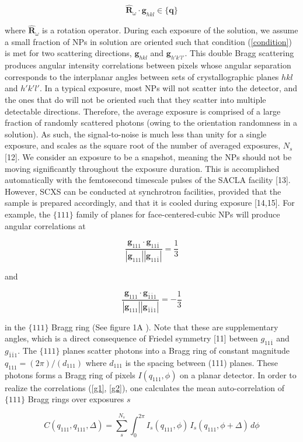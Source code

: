 \documentclass [11pt,fleqn]{article}
\def \be {\begin{equation}}
\def \ee {\end{equation}}
\begin{document}
\be \label{condition}
\hat{\bm R}_\omega \cdot \bm g_{hkl} \in \{\bm q\}
\ee

where $\hat{\bm R}_\omega$ is a rotation operator. During each exposure of the solution, we assume a small fraction of NPs in solution are oriented such that condition (\ref{condition}) is met for two scattering directions, $\bm g_{hkl}$ and $\bm g_{h'k'l'}$. This double Bragg scattering produces angular intensity correlations between pixels whose angular separation corresponds to the interplanar angles between sets of crystallographic planes $hkl$ and $h'k'l'$. In a typical exposure, most NPs will not scatter into the detector, and the ones that do will not be oriented such that they scatter into multiple detectable directions. Therefore, the average exposure is comprised of a large fraction of randomly scattered photons (owing to the orientation randomness in  a solution). As such, the signal-to-noise is much less than unity for a single exposure, and scales as the square root of the number of averaged exposures, $N_s$ [12]. We consider an exposure to be a snapshot, meaning the NPs should not be moving significantly throughout the exposure duration. This is accomplished automatically with the femtosecond timescale pulses of the SACLA facility [13]. However, SCXS can be conducted at synchrotron facilities, provided  that the sample is prepared accordingly, and that it is cooled during exposure [14,15].  For example, the $\{111\}$ family of planes for face-centered-cubic NPs will produce angular correlations at

\be \label{g1}
\frac{\bm g_{111} \cdot \bm g_{11\bar{1}}}{|\bm g_{111}| |\bm g_{11\bar{1}}| } = \frac{1}{3}
\ee

and

\be \label {g2}
\frac{\bm g_{111} \cdot \bm g_{\bar{1}\bar{1}1}}{|\bm g_{111}| |\bm g_{\bar{1}\bar{1}1}| } = -\frac{1}{3}
\ee

in the $\{111\}$ Bragg ring (See figure 1A ). Note that these are supplementary angles, which is a direct consequence of Friedel symmetry [11] between $g_{11\bar{1}}$ and $g_{\bar{1}\bar{1}1}$. The $\{111\}$ planes scatter photons into a Bragg ring of constant magnitude $q_{111} = ( 2\pi ) / ( d_{111} )$ where $d_{111}$ is the spacing between (111) planes. These photons forms a Bragg ring of pixels $I(q_{111},\phi)$ on a planar detector. In order to realize the correlations (\ref{g1}, \ref{g2}), one calculates the mean auto-correlation of $\{111\}$ Bragg rings over exposures $s$

\be \label{autocorr}
C(q_{111}, q_{111}, \Delta) = \sum _s ^ {N_s} \int _0^{2\pi} I_s(q_{111}, \phi  )\, I_s(q_{111}, \phi + \Delta)\, d\phi
\ee
\end{document}
